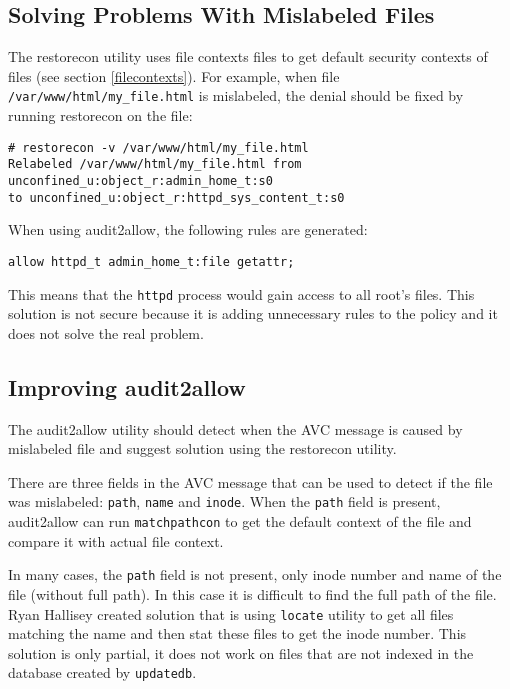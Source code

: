 \subsection{Solving Problems With Mislabeled Files}
The restorecon utility uses file contexts files to get default security contexts
of files (see section \ref{filecontexts}). For example, when file
\texttt{/var/www/html/my\_file.html} is mislabeled, the denial should be fixed
by running restorecon on the file:
\begin{lstlisting}
# restorecon -v /var/www/html/my_file.html
Relabeled /var/www/html/my_file.html from unconfined_u:object_r:admin_home_t:s0
to unconfined_u:object_r:httpd_sys_content_t:s0
\end{lstlisting}

When using audit2allow, the following rules are generated:
\begin{lstlisting}
allow httpd_t admin_home_t:file getattr;
\end{lstlisting}
This means that the \texttt{httpd} process would gain access to all root's
files. This solution is not secure because it is adding unnecessary rules to the
policy and it does not solve the real problem.

\subsection{Improving audit2allow}
The audit2allow utility should detect when the AVC message is caused by
mislabeled file and suggest solution using the restorecon utility.

There are three fields in the AVC message that can be used to detect if the file
was mislabeled: \texttt{path}, \texttt{name} and \texttt{inode}. When the
\texttt{path} field is present, audit2allow can run \texttt{matchpathcon} to get
the default context of the file and compare it with actual file context.

In many cases, the \texttt{path} field is not present, only inode number and
name of the file (without full path). In this case it is difficult to find the
full path of the file. Ryan Hallisey created solution \cite{restoreconpullreq}
that is using \texttt{locate} utility to get all files matching the name and
then stat these files to get the inode number. This solution is only partial, it
does not work on files that are not indexed in the database created by
\texttt{updatedb}.

